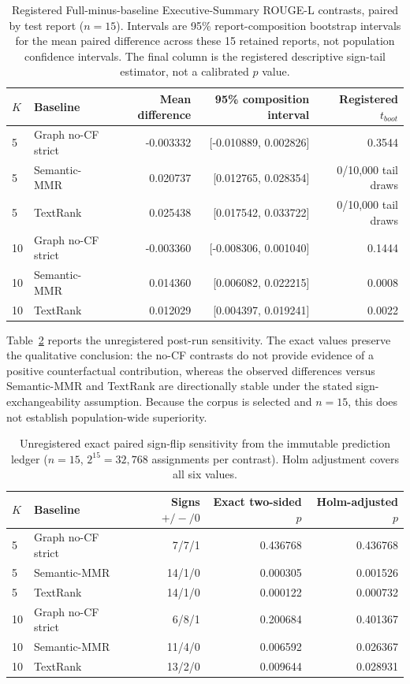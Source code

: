 \documentclass[applsci,article,submit,moreauthors]{Definitions/mdpi}
\begin{document}
\begin{table}[H]
\caption{Registered Full-minus-baseline Executive-Summary ROUGE-L contrasts, paired by test report ($n=15$). Intervals are 95\% report-composition bootstrap intervals for the mean paired difference across these 15 retained reports, not population confidence intervals. The final column is the registered descriptive sign-tail estimator, not a calibrated $p$ value.}
\label{tab:contrasts}\centering\small
\begin{tabular}{llrrr}
\toprule
$K$ & Baseline & Mean difference & 95\% composition interval & Registered $t_{boot}$\\
\midrule
5 & Graph no-CF strict & -0.003332 & [-0.010889, 0.002826] & 0.3544\\
5 & Semantic-MMR & 0.020737 & [0.012765, 0.028354] & 0/10,000 tail draws\\
5 & TextRank & 0.025438 & [0.017542, 0.033722] & 0/10,000 tail draws\\
10 & Graph no-CF strict & -0.003360 & [-0.008306, 0.001040] & 0.1444\\
10 & Semantic-MMR & 0.014360 & [0.006082, 0.022215] & 0.0008\\
10 & TextRank & 0.012029 & [0.004397, 0.019241] & 0.0022\\
\bottomrule
\end{tabular}
\end{table}

Table~\ref{tab:signflip} reports the unregistered post-run sensitivity. The exact values preserve the qualitative conclusion: the no-CF contrasts do not provide evidence of a positive counterfactual contribution, whereas the observed differences versus Semantic-MMR and TextRank are directionally stable under the stated sign-exchangeability assumption. Because the corpus is selected and $n=15$, this does not establish population-wide superiority.

\begin{table}[H]
\caption{Unregistered exact paired sign-flip sensitivity from the immutable prediction ledger ($n=15$, $2^{15}=32{,}768$ assignments per contrast). Holm adjustment covers all six values.}
\label{tab:signflip}\centering\small
\begin{tabular}{llrrr}
\toprule
$K$ & Baseline & Signs $+/-/0$ & Exact two-sided $p$ & Holm-adjusted $p$\\
\midrule
5 & Graph no-CF strict & 7/7/1 & 0.436768 & 0.436768\\
5 & Semantic-MMR & 14/1/0 & 0.000305 & 0.001526\\
5 & TextRank & 14/1/0 & 0.000122 & 0.000732\\
10 & Graph no-CF strict & 6/8/1 & 0.200684 & 0.401367\\
10 & Semantic-MMR & 11/4/0 & 0.006592 & 0.026367\\
10 & TextRank & 13/2/0 & 0.009644 & 0.028931\\
\bottomrule
\end{tabular}
\end{table}
\end{document}
